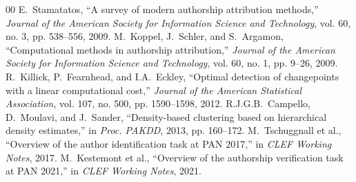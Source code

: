 \documentclass[conference]{IEEEtran}
\begin{document}
\begin{thebibliography}{00}
 E.~Stamatatos, ``A survey of modern authorship attribution methods,'' \textit{Journal of the American Society for Information Science and Technology}, vol. 60, no. 3, pp. 538--556, 2009.
 M.~Koppel, J.~Schler, and S.~Argamon, ``Computational methods in authorship attribution,'' \textit{Journal of the American Society for Information Science and Technology}, vol. 60, no. 1, pp. 9--26, 2009.
 R.~Killick, P.~Fearnhead, and I.A.~Eckley, ``Optimal detection of changepoints with a linear computational cost,'' \textit{Journal of the American Statistical Association}, vol. 107, no. 500, pp. 1590--1598, 2012.
 R.J.G.B.~Campello, D.~Moulavi, and J.~Sander, ``Density-based clustering based on hierarchical density estimates,'' in \textit{Proc. PAKDD}, 2013, pp. 160--172.
 M.~Tschuggnall et al., ``Overview of the author identification task at PAN 2017,'' in \textit{CLEF Working Notes}, 2017.
 M.~Kestemont et al., ``Overview of the authorship verification task at PAN 2021,'' in \textit{CLEF Working Notes}, 2021.
\end{thebibliography}
\end{document}
